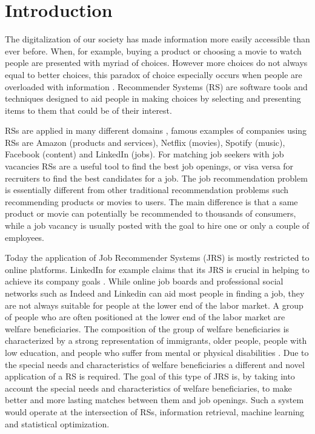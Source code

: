 \section{Introduction}
\label{sec:intro}




The digitalization of our society has made information more easily accessible than ever before.
When, for example, buying a product or choosing a movie to watch people are presented with myriad of choices. 
However more choices do not always equal to better choices, this paradox of choice especially occurs when people are overloaded with information \cite{schwartz2004paradox}. 
Recommender Systems (RS) are software tools and techniques designed to aid people in making choices by selecting and presenting items to them that could be of their interest.

RSs are applied in many different domains \cite{aggarwal2016recommender}, famous examples of companies using RSs are Amazon (products and services), Netflix (movies), Spotify (music), Facebook (content) and LinkedIn (jobs).
For matching job seekers with job vacancies RSs are a useful tool to find the best job openings, or visa versa for recruiters to find the best candidates for a job.
The job recommendation problem is essentially different from other traditional recommendation problems such recommending products or movies to users.
The main difference is that a same product or movie can potentially be recommended to thousands of consumers, while a job vacancy is usually posted with the goal to hire one or only a couple of employees.

Today the application of Job Recommender Systems (JRS) is mostly restricted to online platforms. 
LinkedIn for example claims that its JRS is crucial in helping to achieve its company goals \cite{kenthapadi2017personalized}.
While online job boards and professional social networks such as Indeed and Linkedin can aid most people in finding a job, they are not always suitable for people at the lower end of the labor market.
A group of people who are often positioned at the lower end of the labor market are welfare beneficiaries. 
The composition of the group of welfare beneficiaries is characterized by a strong representation of immigrants, older people, people with low education, and people who suffer from mental or physical disabilities \cite{dodeweerd}.
Due to the special needs and characteristics of welfare beneficiaries a different and novel application of a RS is required. 
The goal of this type of JRS is, by taking into account the special needs and characteristics of welfare beneficiaries, to make better and more lasting matches between them and job openings.
Such a system would operate at the intersection of RSs, information retrieval, machine learning and statistical optimization. 

